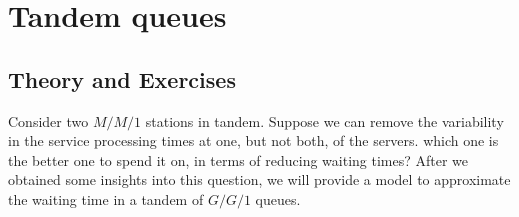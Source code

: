 
\section{Tandem queues}
\label{sec:tandem-queues}


\subsection*{Theory and Exercises}



Consider two $M/M/1$ stations in tandem. Suppose we can remove the variability in the service processing times at one, but not both, of the servers. which one is the better one to spend it on, in terms of reducing waiting times?  After we obtained some insights into this question, we will provide a model to approximate the waiting time in a tandem  of $G/G/1$ queues.

